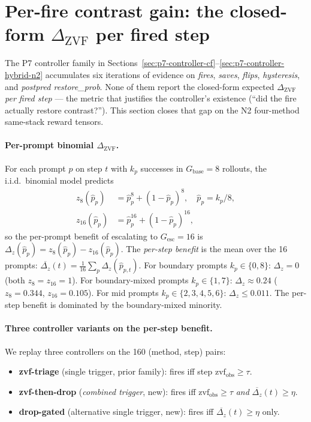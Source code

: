 \section{Per-fire contrast gain: the closed-form $\Delta_{\mathrm{ZVF}}$ per fired step}
\label{sec:p7-iter91-perfire-gain}

The P7 controller family in Sections~\ref{sec:p7-controller-cf}--\ref{sec:p7-controller-hybrid-n2}
accumulates six iterations of evidence on \emph{fires}, \emph{saves},
\emph{flips}, \emph{hysteresis}, and \emph{postpred restore\_prob}.
None of them report the closed-form expected $\Delta_{\mathrm{ZVF}}$
\emph{per fired step} --- the metric that justifies the controller's
existence (``did the fire actually restore contrast?''). This
section closes that gap on the N2 four-method same-stack reward tensors.

\paragraph{Per-prompt binomial $\Delta_{\mathrm{ZVF}}$.}
For each prompt $p$ on step $t$ with $k_p$ successes in $G_{\mathrm{base}}{=}8$
rollouts, the i.i.d.\ binomial model predicts
\begin{align}
z_8(\hat p_p)   &= \hat p_p^{8}   + (1-\hat p_p)^{8},   \quad \hat p_p = k_p/8, \\
z_{16}(\hat p_p) &= \hat p_p^{16} + (1-\hat p_p)^{16},
\end{align}
so the per-prompt benefit of escalating to $G_{\mathrm{esc}}{=}16$ is
$\Delta_z(\hat p_p) = z_8(\hat p_p) - z_{16}(\hat p_p)$. The
\emph{per-step benefit} is the mean over the 16 prompts:
$\overline{\Delta_z}(t) = \tfrac{1}{16}\sum_p \Delta_z(\hat p_{p,t})$.
For boundary prompts $k_p\in\{0,8\}$: $\Delta_z = 0$ (both
$z_8 = z_{16} = 1$). For boundary-mixed prompts
$k_p\in\{1,7\}$: $\Delta_z \approx 0.24$
($z_8 = 0.344$, $z_{16} = 0.105$). For mid prompts
$k_p\in\{2,3,4,5,6\}$: $\Delta_z \le 0.011$. The per-step benefit
is dominated by the boundary-mixed minority.

\paragraph{Three controller variants on the per-step benefit.}
We replay three controllers on the 160 (method, step) pairs:

\begin{itemize}
\item \textbf{zvf-triage} (single trigger, prior family): fires iff step $\mathrm{zvf}_{\mathrm{obs}} \geq \tau$.
\item \textbf{zvf-then-drop} (\emph{combined trigger}, new): fires iff $\mathrm{zvf}_{\mathrm{obs}} \geq \tau$ \emph{and} $\overline{\Delta_z}(t) \geq \eta$.
\item \textbf{drop-gated} (alternative single trigger, new): fires iff $\overline{\Delta_z}(t) \geq \eta$ only.
\end{itemize}

